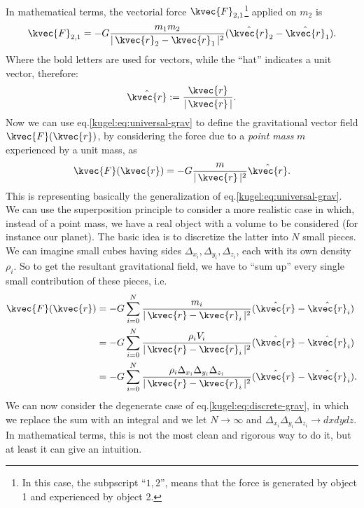 In mathematical terms, the vectorial force $\kvec{F}_{2,1}$\footnote{In this case, the subpscript ``$1,2$'',  
means that the force is generated by object 1 and experienced by object 2.} applied on $m_2$ is
\begin{equation}
  \kvec{F}_{2,1} = -G\frac{m_1m_2}{|\, \kvec{r}_2 - \kvec{r}_1 \,|^2} ( \hat{\kvec{r}}_2-\hat{\kvec{r}}_1 ).\label{kugel:eq:universal-grav}
\end{equation}
Where the bold letters are used for vectors, while the ``hat'' indicates a unit vector, therefore:
\begin{equation*}
  \hat{\kvec{r}} := \frac{\kvec{r}}{|\,\kvec{r}\,|}.
\end{equation*}
Now we can use eq.\eqref{kugel:eq:universal-grav} to define the gravitational vector field $\kvec{F}(\kvec{r})$,  by considering the force due to a \emph{point mass} $m$ experienced by a unit mass, as
\begin{equation}
  \kvec{F}(\kvec{r}) = -G\frac{m}{|\, \kvec{r} \,|^2}\hat{\kvec{r}}. \label{kugel:eq:grav-vec-field}
\end{equation}
This is representing basically the generalization of eq.\eqref{kugel:eq:universal-grav}.
We can use the superposition principle to consider a more realistic case in which, instead of a point mass, we have a real object with a volume to be considered (for instance our planet). 
The basic idea is to discretize the latter into $N$ small pieces. We can imagine small cubes having sides $\Delta_{x_i}, \Delta_{y_i}, \Delta_{z_i}$, 
each with its own density $\rho_i$. So to get the resultant gravitational field, we have to ``sum up'' every single small contribution of these pieces, i.e.
\begin{align}
  \kvec{F}(\kvec{r}) &= -G \sum_{i=0}^N \frac{m_i}{|\, \kvec{r}-\kvec{r}_i \,|^2}(\hat{\kvec{r}}-\hat{\kvec{r}}_i) \nonumber \\ 
                     &= -G \sum_{i=0}^N \frac{\rho_i V_i}{|\, \kvec{r}-\kvec{r}_i \,|^2}(\hat{\kvec{r}}-\hat{\kvec{r}}_i) \nonumber \\
                     &= -G \sum_{i=0}^N \frac{\rho_i \Delta_{x_i}\Delta_{y_i}\Delta_{z_i}}{|\, \kvec{r}-\kvec{r}_i \,|^2}(\hat{\kvec{r}}-\hat{\kvec{r}}_i). \label{kugel:eq:discrete-grav}
\end{align}
We can now consider the degenerate case of eq.\eqref{kugel:eq:discrete-grav}, in which we replace the sum with an integral and we let $N\to \infty$ and $\Delta_{x_i}\Delta_{y_i}\Delta_{z_i}\to dxdydz$.
In mathematical terms, this is not the most clean and rigorous way to do it, but at least it can give an intuition. 

